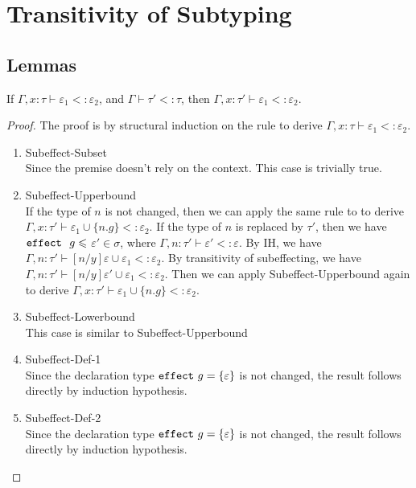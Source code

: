 \pagebreak


\appendix
\chapter{Transitivity of Subtyping}
\section{Lemmas}
\begin{lemma}
If $\Gamma, x : \tau \vdash \varepsilon_1 <: \varepsilon_2$, and $\Gamma \vdash \tau' <: \tau$, then $\Gamma, x : \tau' \vdash \varepsilon_1 <: \varepsilon_2$.
\begin{proof}
The proof is by structural induction on the rule to derive $\Gamma, x : \tau \vdash \varepsilon_1 <: \varepsilon_2$. \begin{enumerate}
\item Subeffect-Subset\\
Since the premise doesn't rely on the context. This case is trivially true.
\item Subeffect-Upperbound\\
If the type of $n$ is not changed, then we can apply the same rule to to derive $\Gamma, x : \tau' \vdash \varepsilon_1 \cup \{n.g\}<: \varepsilon_2$. If the type of $n$ is replaced by $\tau'$, then we have $\mathtt{effect}~\ g \leqslant$ $\varepsilon' \in \sigma$, where $\Gamma, n: \tau' \vdash \varepsilon' <: \varepsilon$. By IH, we have $\Gamma, n : \tau' \vdash [n/y]\varepsilon \cup \varepsilon_1 <: \varepsilon_2$. By transitivity of subeffecting, we have $\Gamma, n : \tau' \vdash [n/y]\varepsilon' \cup \varepsilon_1 <: \varepsilon_2$. Then we can apply Subeffect-Upperbound again to derive $\Gamma, x : \tau' \vdash \varepsilon_1 \cup \{n.g\}<: \varepsilon_2$.
\item Subeffect-Lowerbound\\ This case is similar to Subeffect-Upperbound
\item Subeffect-Def-1\\ Since the declaration type $\mathtt{effect}~ g = \{\varepsilon\}$ is not changed, the result follows directly by induction hypothesis.
\item Subeffect-Def-2\\ Since the declaration type $\mathtt{effect}~ g = \{\varepsilon\}$ is not changed, the result follows directly by induction hypothesis.
\end{enumerate}
\end{proof}
\label{lemma-context-effect}
\end{lemma}

